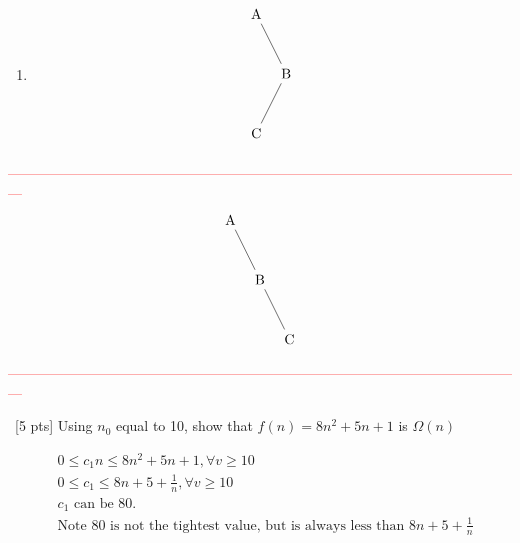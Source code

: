 \documentclass[12pt]{article}
\newenvironment{sol}[1][Solution]{\begin{trivlist}\item[\hskip\labelsep {\bfseries #1:}]}{\end{trivlist}}
\begin{document}
\begin{enumerate}
\begin{sol}
\begin{enumerate}
        \item
        \begin{align*}
        \begin{tikzpicture}
            \node{A}
            child[missing]
            child{
                node{B}
                    child{
                        node{C}
                    }
                    child[missing]
            };
        \end{tikzpicture}
        \end{align*}
        \end{enumerate}

        \textcolor{red}{---------------------------------------------------------------------------------------------------------------}
        \begin{align*}
            \begin{tikzpicture}
                \node{A}
            child[missing]
            child{
                node{B}
                    child[missing]
                    child{
                        node{C}
                    }
            };
            \end{tikzpicture}
        \end{align*}
        \textcolor{red}{---------------------------------------------------------------------------------------------------------------}
    \end{sol}

    \item \ [5 pts] Using $n_0$ equal to 10, show that $f(n) = 8n^2+5n+1$ is $\Omega(n)$
    \begin{sol}
    \begin{align*}
        & 0 \leq c_1n \leq 8n^2 + 5n +1, \forall v \geq 10 \\
        & 0 \leq c_1 \leq 8n + 5 + \frac{1}{n}, \forall v \geq 10 \\
        & c_1 \text{ can be } 80. \\
        &\text{Note } 80 \text{ is not the tightest value, but is always less than } 8n + 5 + \frac{1}{n}
    \end{align*}
    \end{sol}


\end{enumerate}
\end{document}

